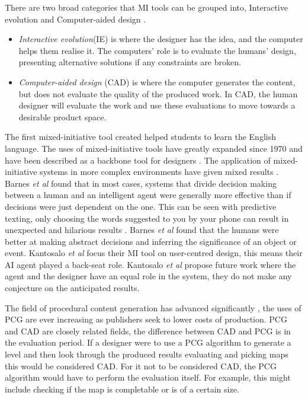 \documentclass[journal]{IEEEtran}
\begin{document}
There are two broad categories that MI tools can be grouped into, Interactive evolution and Computer-aided design \cite{liapis2016mixed}. 
\begin{itemize}
    \item \textit{Interactive evolution}(IE) is where the designer has the idea,  and the computer helps them realise it. The computers' role is to evaluate the humans' design, presenting alternative solutions if any constraints are broken. 
    
    \item \textit{Computer-aided design} (CAD) is where the computer generates the content, but does not evaluate the quality of the produced work. In CAD, the human designer will evaluate the work and use these evaluations to move towards a desirable product space.
\end{itemize}

The first mixed-initiative tool created helped students to learn the English language. The uses of mixed-initiative tools have greatly expanded since 1970 and have been described as a backbone tool for designers \cite{alvarez2018fostering}. The application of mixed-initiative systems in more complex environments have given mixed results \cite{barnes2015designing}. Barnes \textit{et al}\cite{barnes2015designing} found that in most cases, systems that divide decision making between a human and an intelligent agent were generally more effective than if decisions were just dependent on the one. This can be seen with predictive texting,  only choosing the words suggested to you by your phone can result in unexpected and hilarious results \cite{quicktype}.  Barnes \textit{et al}\cite{barnes2015designing} found that the humans were better at making abstract decisions and inferring the significance of an object or event. Kantosalo \textit{et al}\cite{kantosalo2014isolation} focus their MI tool on user-centred design, this means their AI agent played a back-seat role. Kantosalo \textit{et al}\cite{kantosalo2014isolation} propose future work where the agent and the designer have an equal role in the system, they do not make any conjecture on the anticipated results.

The field of procedural content generation has advanced significantly \cite{van2013designing}, the uses of PCG are ever increasing as publishers seek to lower costs of production\cite{doherty2005mixed, font2016constrained}. PCG and CAD are closely related fields, the difference between CAD and PCG is in the evaluation period. If a designer were to use a PCG algorithm to generate a level and then look through the produced results evaluating and picking maps this would be considered CAD\cite{liapis2016mixed}. For it not to be considered CAD, the PCG algorithm would have to perform the evaluation itself. For example, this might include checking if the map is completable or is of a certain size. 
\end{document}
